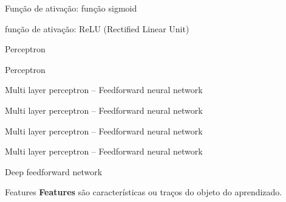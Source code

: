 \documentclass[10pt]{beamer}
\begin{document}
\begin{frame}{Função de ativação: função sigmoid}

\end{frame}

\begin{frame}{função de ativação: ReLU (Rectified Linear Unit)}

\end{frame}

\begin{frame}[fragile]{Perceptron}

\end{frame}

\begin{frame}[fragile]{Perceptron}

\end{frame}

\begin{frame}[fragile]{Multi layer perceptron -- Feedforward neural network}

\end{frame}

\begin{frame}[fragile]{Multi layer perceptron -- Feedforward neural network}

\end{frame}

\begin{frame}[fragile]{Multi layer perceptron -- Feedforward neural network}

\end{frame}

\begin{frame}[fragile]{Multi layer perceptron -- Feedforward neural network}

\end{frame}

\begin{frame}[fragile]{Deep feedforward network}

\end{frame}


\begin{frame}[fragile]{Features}
\textbf{\alert{Features}} são características ou traços do objeto do aprendizado.
\\
\\
\end{frame}
\end{document}
